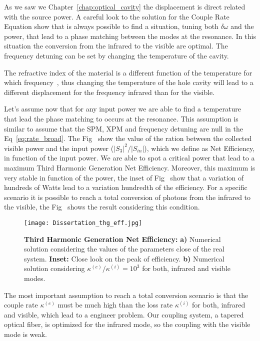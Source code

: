 As we saw we Chapter~\ref{chap:optical_cavity} the displacement is direct related with the source power. A careful look to the solution for the Couple Rate Equation show that is always possible to find a situation, tuning both $\delta\omega$ and the power, that lead to a phase matching between the modes at the resonance. In this situation the conversion from the infrared to the visible are optimal. The frequency detuning can be set by changing the temperature of the cavity. 

The refractive index of the material is a different function of the temperature for which frequency~\needcit, thus changing the temperature of the hole cavity will lead to a different displacement for the frequency infrared than for the visible. 

Let's assume now that for any input power we are able to find a temperature that lead the phase matching to occurs at the resonance. This assumption is similar to assume that the SPM, XPM and frequency detuning are null in the Eq~\ref{eq:rate_broad}. The Fig~
show the value of the ration between the collected visible power and the input power ($|S_3|^2/|S_{in}|$), which we define as Net Efficiency, in function of the input power. We are able to spot a critical power that lead to a maximum Third Harmonic Generation Net Efficiency. Moreover, this maximum is very stable in function of the power, the inset of Fig~ show that a variation of hundreds of Watts lead to a variation hundredth of the efficiency. For a specific scenario it is possible to reach a total conversion of photons from the infrared to the visible, the Fig~ shows the result considering this condition. 

\begin{figure}[h]
    \centering
    \texttt{[image: Dissertation\_thg\_eff.jpg]}
    \caption{\textbf{Third Harmonic Generation Net Efficiency:} \textbf{a)} Numerical solution considering the values of the parameters close of the real system. \textbf{Inset:} Close look on the peak of efficiency. \textbf{b)} Numerical solution considering $\kappa^{(e)}/\kappa^{(i)} = 10^3$ for both, infrared and visible modes.}  
    \label{fig:power_solution}
\end{figure}

The most important assumption to reach a total conversion scenario is that the couple rate $\kappa^{(e)}$ must be much high than the loss rate $\kappa^{(i)}$ for both, infrared and visible, which lead to a engineer problem. Our coupling system, a tapered optical fiber, is optimized for the infrared mode, so the coupling with the visible mode is weak.

